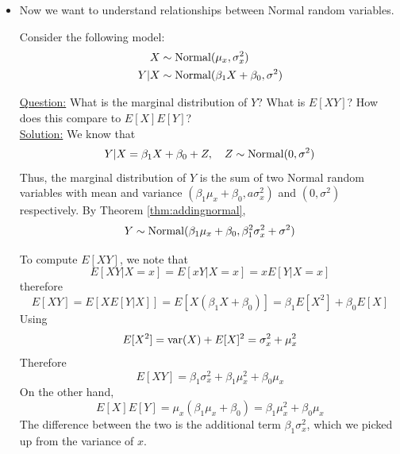 \begin{itemize}
\item Now we want to understand relationships between Normal random variables. 
 \begin{example}\label{ex:firstreg}
Consider the following model:
\begin{align*}
X &\sim {\rm Normal}(\mu_x,\sigma_x^2)\\
Y|X &\sim {\rm Normal}(\beta_1X + \beta_0,\sigma^2)
\end{align*}

 \noindent
\underline{Question:} What is the marginal distribution of $Y$? What is $E[XY]$? How does this compare to $E[X]E[Y]$?\\


 \noindent
\underline{Solution:} We know that 
\begin{equation*}
Y|X =\beta_1X+\beta_0 + Z,\quad Z \sim {\rm Normal}(0,\sigma^2)
\end{equation*}
Thus, the marginal distribution of $Y$ is the sum of two Normal random variables with mean and variance $(\beta_1\mu_x+\beta_0,a\sigma_x^2)$ and $(0,\sigma^2)$ respectively. 
By Theorem \ref{thm:addingnormal}, 
\begin{equation*}
Y  \sim {\rm Normal}(\beta_1\mu_x+\beta_0,\beta_1^2\sigma_x^2 + \sigma^2)
\end{equation*}

To compute $E[XY]$, we note that 
\begin{equation*}
E[XY|X=x]=  E[xY|X=x]= xE[Y|X=x]
\end{equation*}
therefore
\begin{equation*}
E[XY] = E[XE[Y|X]] = E[X(\beta_1X+\beta_0)] = \beta_1E[X^2]+\beta_0E[X]
\end{equation*}
Using 
\begin{equation*}
E[X^2] = {\rm var}(X) + E[X]^2 = \sigma_x^2 + \mu_x^2
\end{equation*}
Therefore 
\begin{equation*}
E[XY] =  \beta_1\sigma_x^2 + \beta_1\mu_x^2 + \beta_0\mu_x
\end{equation*}
On the other hand, 
\begin{equation*}
E[X]E[Y] = \mu_x(\beta_1\mu_x+\beta_0) = \beta_1 \mu_x^2 +\beta_0 \mu_x
\end{equation*}
The difference between the two is the additional term $\beta_1\sigma_x^2$, which we picked up from the variance of $x$.  


\end{example}


\end{itemize}
